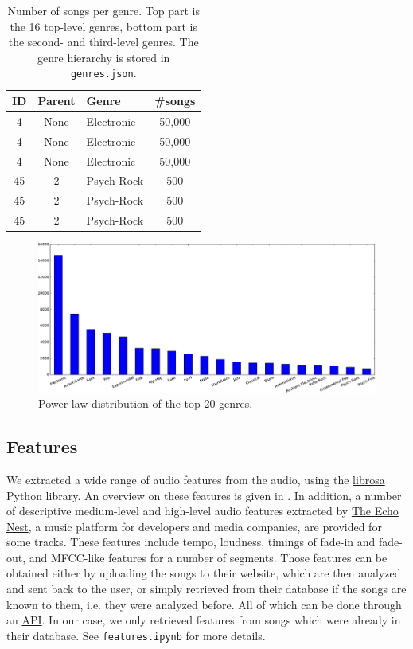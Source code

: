 \documentclass{article}
\begin{document}
\begin{table}
	\centering
	\begin{tabular}{cclc}
		\toprule
		ID & Parent & Genre & \#songs \\
		\midrule
		4 & None & Electronic & 50,000 \\
		4 & None & Electronic & 50,000 \\
		4 & None & Electronic & 50,000 \\
		\midrule
		45 & 2 & Psych-Rock & 500 \\
		45 & 2 & Psych-Rock & 500 \\
		45 & 2 & Psych-Rock & 500 \\
		\bottomrule
	\end{tabular}
	\caption{Number of songs per genre. Top part is the 16 top-level genres, bottom part is the second- and third-level genres. The genre hierarchy is stored in \texttt{genres.json}.}
	\label{tab:genres}
\end{table}

\begin{figure}
	\centering
	\includegraphics[width=\linewidth]{histo_large.pdf}
	\caption{Power law distribution of the top 20 genres.}
	\label{fig:genres}
\end{figure}

\subsection{Features} %

We extracted a wide range of audio features from the audio, using the \href{https://github.com/librosa/librosa}{librosa} Python library. An overview
on these features is given in .
In addition, a number of descriptive medium-level and high-level audio features extracted by \href{http://the.echonest.com/}{The Echo Nest}, a music platform for developers and media companies, are provided for some tracks. These features include tempo, loudness, timings of fade-in and fade-out, and MFCC-like features for a number of segments.
Those features can be obtained either by uploading the songs to their website, which are then analyzed and sent back to the user, or simply retrieved from their database if the songs are known to them, i.e. they were analyzed before. All of which can be done through an \href{http://developer.echonest.com}{API}. In our case, we only retrieved features from songs which were already in their database.
See \texttt{features.ipynb} for more details.
\end{document}
